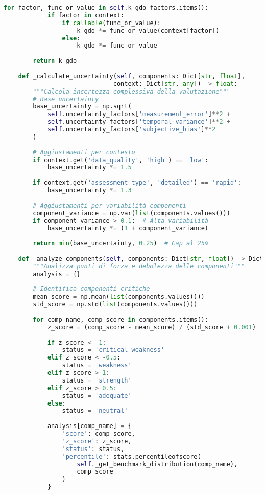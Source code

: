 \begin{lstlisting}[language=Python, caption=Classe GISTFramework Completa]
        for factor, func_or_value in self.k_gdo_factors.items():
            if factor in context:
                if callable(func_or_value):
                    k_gdo *= func_or_value(context[factor])
                else:
                    k_gdo *= func_or_value
        
        return k_gdo
    
    def _calculate_uncertainty(self, components: Dict[str, float], 
                              context: Dict[str, any]) -> float:
        """Calcola incertezza complessiva della valutazione"""
        # Base uncertainty
        base_uncertainty = np.sqrt(
            self.uncertainty_factors['measurement_error']**2 +
            self.uncertainty_factors['temporal_variance']**2 +
            self.uncertainty_factors['subjective_bias']**2
        )
        
        # Aggiustamenti per contesto
        if context.get('data_quality', 'high') == 'low':
            base_uncertainty *= 1.5
            
        if context.get('assessment_type', 'detailed') == 'rapid':
            base_uncertainty *= 1.3
        
        # Aggiustamenti per variabilità componenti
        component_variance = np.var(list(components.values()))
        if component_variance > 0.1:  # Alta variabilità
            base_uncertainty *= (1 + component_variance)
        
        return min(base_uncertainty, 0.25)  # Cap al 25%
    
    def _analyze_components(self, components: Dict[str, float]) -> Dict[str, any]:
        """Analizza punti di forza e debolezza delle componenti"""
        analysis = {}
        
        # Identifica componenti critiche
        mean_score = np.mean(list(components.values()))
        std_score = np.std(list(components.values()))
        
        for comp_name, comp_score in components.items():
            z_score = (comp_score - mean_score) / (std_score + 0.001)
            
            if z_score < -1:
                status = 'critical_weakness'
            elif z_score < -0.5:
                status = 'weakness'
            elif z_score > 1:
                status = 'strength'
            elif z_score > 0.5:
                status = 'adequate'
            else:
                status = 'neutral'
            
            analysis[comp_name] = {
                'score': comp_score,
                'z_score': z_score,
                'status': status,
                'percentile': stats.percentileofscore(
                    self._get_benchmark_distribution(comp_name), 
                    comp_score
                )
            }
        

\end{lstlisting}
